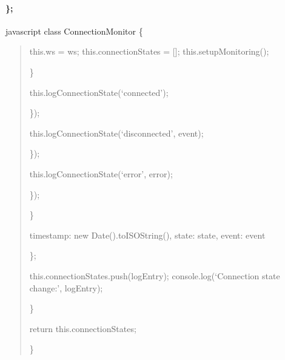 \documentclass[letterpaper,10pt,english]{sphinxmanual}
\begin{document}
\paragraph{\};}
\label{\detokenize{api/websocket-api:id174}}
\sphinxAtStartPar
{}
{\color{red}\bfseries{}\textasciigrave{}\textasciigrave{}}{\color{red}\bfseries{}\textasciigrave{}}javascript
class ConnectionMonitor \{
\begin{quote}
\begin{description}
\sphinxAtStartPar
this.ws = ws;
this.connectionStates = {[}{]};
this.setupMonitoring();

\end{description}

\sphinxAtStartPar
\}
\begin{description}
\begin{description}
\sphinxAtStartPar
this.logConnectionState(‘connected’);

\end{description}

\sphinxAtStartPar
\});
\begin{description}
\sphinxAtStartPar
this.logConnectionState(‘disconnected’, event);

\end{description}

\sphinxAtStartPar
\});
\begin{description}
\sphinxAtStartPar
this.logConnectionState(‘error’, error);

\end{description}

\sphinxAtStartPar
\});

\end{description}

\sphinxAtStartPar
\}
\begin{description}
\begin{description}
\sphinxAtStartPar
timestamp: new Date().toISOString(),
state: state,
event: event

\end{description}

\sphinxAtStartPar
\};

\sphinxAtStartPar
this.connectionStates.push(logEntry);
console.log(‘Connection state change:’, logEntry);

\end{description}

\sphinxAtStartPar
\}
\begin{description}
\sphinxAtStartPar
return this.connectionStates;

\end{description}

\sphinxAtStartPar
\}
\end{quote}
\end{document}
